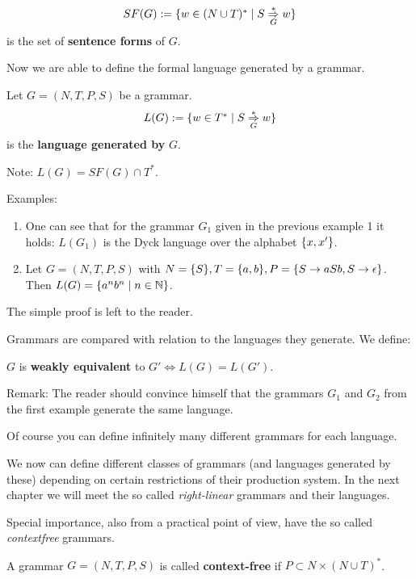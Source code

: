 \begin{definition}
\[ SF(G) := \mbox{$\{w \in (N \cup T)^* \mid S \underset{G}{\overset{*}{\Rightarrow}} w\}$} \] is the set of
{\bf sentence forms} of $G$.
\end{definition}

Now we are able to define the formal language generated by a grammar.

\begin{definition}
Let $G = (N, T, P, S)$ be a grammar. \[ L(G) := \mbox{$\{w \in T^* \mid S
\underset{G}{\overset{*}{\Rightarrow}} w\}$} \] is the {\bf language generated by} $G$.
\end{definition}

Note: $L(G) = SF(G) \cap T^*$.

Examples:
\begin{enumerate}
  \item One can see that for the grammar $G_1$ given in the previous example 1
  it holds: $L(G_1)$ is the Dyck language over the alphabet $\mbox{$\{x, x'\}$}$.
  \item Let $G = (N, T, P, S)$ with $N = \mbox{$\{S\}$}, T = \mbox{$\{a, b\}$}, P =
  \mbox{$\{S \to aSb, S \to \epsilon\}$}$. Then $L(G) = \mbox{$\{a^n b^n \mid n \in
  \mathbb{N}\}$}$.
\end{enumerate}

The simple proof is left to the reader.

Grammars are compared with relation to the languages they generate. We define:

\begin{definition}
$G$ is {\bf weakly equivalent} to $G' \Leftrightarrow L(G) = L(G')$.
\end{definition}

Remark: The reader should convince himself that the grammars $G_1$ and $G_2$
from the first example generate the same language.

Of course you can define infinitely many different grammars for each language.

We now can define different classes of grammars (and languages generated by
these) depending on certain restrictions of their production system. In the next
chapter we will meet the so called {\em right-linear} grammars and their
languages.

Special importance, also from a practical point of view, have the so called
{\em contextfree} grammars.

\begin{definition}
A grammar $G = (N, T, P, S)$ is called {\bf context-free} if $P \subset N \times
(N \cup T)^*$.
\end{definition}


